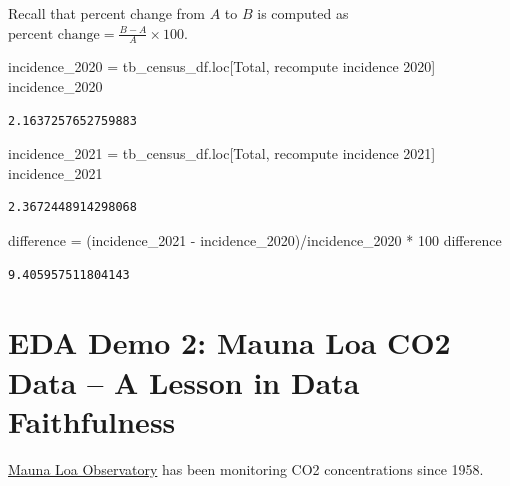 \documentclass[
  letterpaper,
  DIV=11,
  numbers=noendperiod]{scrreprt}
\newenvironment{Shaded}{\begin{snugshade}}{\end{snugshade}}
\newcommand{\DecValTok}[1]{\textcolor[rgb]{0.68,0.00,0.00}{#1}}
\newcommand{\NormalTok}[1]{\textcolor[rgb]{0.00,0.23,0.31}{#1}}
\newcommand{\OperatorTok}[1]{\textcolor[rgb]{0.37,0.37,0.37}{#1}}
\newcommand{\StringTok}[1]{\textcolor[rgb]{0.13,0.47,0.30}{#1}}
\begin{document}
Recall that percent change from \(A\) to \(B\) is computed as
\(\text{percent change} = \frac{B - A}{A} \times 100\).

\begin{Shaded}
\begin{Highlighting}[]
\NormalTok{incidence\_2020 }\OperatorTok{=}\NormalTok{ tb\_census\_df.loc[}\StringTok{\textquotesingle{}Total\textquotesingle{}}\NormalTok{, }\StringTok{\textquotesingle{}recompute incidence 2020\textquotesingle{}}\NormalTok{]}
\NormalTok{incidence\_2020}
\end{Highlighting}
\end{Shaded}

\begin{verbatim}
2.1637257652759883
\end{verbatim}

\begin{Shaded}
\begin{Highlighting}[]
\NormalTok{incidence\_2021 }\OperatorTok{=}\NormalTok{ tb\_census\_df.loc[}\StringTok{\textquotesingle{}Total\textquotesingle{}}\NormalTok{, }\StringTok{\textquotesingle{}recompute incidence 2021\textquotesingle{}}\NormalTok{]}
\NormalTok{incidence\_2021}
\end{Highlighting}
\end{Shaded}

\begin{verbatim}
2.3672448914298068
\end{verbatim}

\begin{Shaded}
\begin{Highlighting}[]
\NormalTok{difference }\OperatorTok{=}\NormalTok{ (incidence\_2021 }\OperatorTok{{-}}\NormalTok{ incidence\_2020)}\OperatorTok{/}\NormalTok{incidence\_2020 }\OperatorTok{*} \DecValTok{100}
\NormalTok{difference}
\end{Highlighting}
\end{Shaded}

\begin{verbatim}
9.405957511804143
\end{verbatim}

\section{EDA Demo 2: Mauna Loa CO2 Data -- A Lesson in Data
Faithfulness}\label{eda-demo-2-mauna-loa-co2-data-a-lesson-in-data-faithfulness}

\href{https://gml.noaa.gov/ccgg/trends/data.html}{Mauna Loa Observatory}
has been monitoring CO2 concentrations since 1958.
\end{document}
